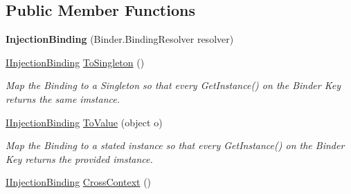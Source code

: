 \subsection*{Public Member Functions}
\begin{DoxyCompactItemize}
\item 
\hypertarget{classstrange_1_1extensions_1_1injector_1_1impl_1_1_injection_binding_ac7cd5da2e7c65f4e60dddc4adeb76aa3}{{\bfseries Injection\-Binding} (Binder.\-Binding\-Resolver resolver)}\label{classstrange_1_1extensions_1_1injector_1_1impl_1_1_injection_binding_ac7cd5da2e7c65f4e60dddc4adeb76aa3}

\item 
\hypertarget{classstrange_1_1extensions_1_1injector_1_1impl_1_1_injection_binding_a0e91d1685d6518e622468bf26e55cd02}{\hyperlink{interfacestrange_1_1extensions_1_1injector_1_1api_1_1_i_injection_binding}{I\-Injection\-Binding} \hyperlink{classstrange_1_1extensions_1_1injector_1_1impl_1_1_injection_binding_a0e91d1685d6518e622468bf26e55cd02}{To\-Singleton} ()}\label{classstrange_1_1extensions_1_1injector_1_1impl_1_1_injection_binding_a0e91d1685d6518e622468bf26e55cd02}

\begin{DoxyCompactList}\small\item\em Map the Binding to a Singleton so that every {\ttfamily Get\-Instance()} on the Binder Key returns the same imstance. \end{DoxyCompactList}\item 
\hypertarget{classstrange_1_1extensions_1_1injector_1_1impl_1_1_injection_binding_a2d5492d1aec7dc4b48f5670e4eb35bde}{\hyperlink{interfacestrange_1_1extensions_1_1injector_1_1api_1_1_i_injection_binding}{I\-Injection\-Binding} \hyperlink{classstrange_1_1extensions_1_1injector_1_1impl_1_1_injection_binding_a2d5492d1aec7dc4b48f5670e4eb35bde}{To\-Value} (object o)}\label{classstrange_1_1extensions_1_1injector_1_1impl_1_1_injection_binding_a2d5492d1aec7dc4b48f5670e4eb35bde}

\begin{DoxyCompactList}\small\item\em Map the Binding to a stated instance so that every {\ttfamily Get\-Instance()} on the Binder Key returns the provided imstance. \end{DoxyCompactList}\item 
\hypertarget{classstrange_1_1extensions_1_1injector_1_1impl_1_1_injection_binding_abd9f222c9ad96768dd1cd9ce76d31f7b}{\hyperlink{interfacestrange_1_1extensions_1_1injector_1_1api_1_1_i_injection_binding}{I\-Injection\-Binding} \hyperlink{classstrange_1_1extensions_1_1injector_1_1impl_1_1_injection_binding_abd9f222c9ad96768dd1cd9ce76d31f7b}{Cross\-Context} ()}\label{classstrange_1_1extensions_1_1injector_1_1impl_1_1_injection_binding_abd9f222c9ad96768dd1cd9ce76d31f7b}


\end{DoxyCompactItemize}
